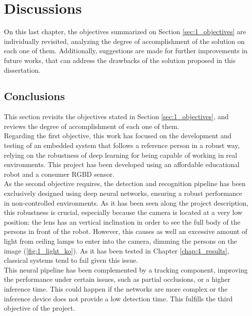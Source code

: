 \chapter{Discussions}
\label{chap:5_discussions}

On this last chapter, the objectives summarized on Section \ref{sec:1_objectives} are individually revisited, analyzing the degree of accomplishment of the solution on each one of them. Additionally, suggestions are made for further improvements in future works, that can address the drawbacks of the solution proposed in this dissertation.


\section{Conclusions}
\label{sec:5_conclusions}
This section revisits the objectives stated in Section  \ref{sec:1_objectives}, and reviews the degree of accomplishment of each one of them.\\

Regarding the first objective, this work has focused on the development and testing of an embedded system that follows a reference person in a robust way, relying on the robustness of deep learning for being capable of working in real environments. This project has been developed using an affordable educational robot and a consumer RGBD sensor.\\

As the second objective requires, the detection and recognition pipeline has been exclusively designed using deep neural networks, ensuring a robust performance in non-controlled environments. As it has been seen along the project description, this robustness is crucial, especially because the camera is located at a very low position: the lens has an vertical inclination in order to see the full body of the persons in front of the robot. However, this causes as well an excessive amount of light from ceiling lamps to enter into the camera, dimming the persons on the image (\autoref{fig:1_light_ko}). As it has been tested in Chapter \ref{chap:4_results}, classical systems tend to fail given this issue.\\


This neural pipeline has been complemented by a tracking component, improving the performance under certain issues, such as partial occlusions, or a higher inference time. This could happen if the networks are more complex or the inference device does not provide a low detection time. This fulfills the third objective of the project.\\

